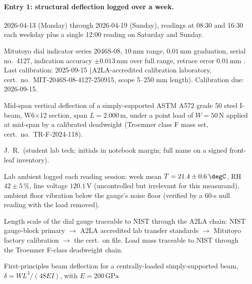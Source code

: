 \paragraph{Entry 1: structural deflection logged over a week.}

\begin{description}[leftmargin=2em, itemsep=2pt]
  \item[Date / time.] 2026-04-13 (Monday) through 2026-04-19
    (Sunday), readings at 08{:}30 and 16{:}30 each weekday plus a
    single 12{:}00 reading on Saturday and Sunday.
  \item[Instrument.] Mitutoyo dial indicator series 2046S-08,
    $10 \,\si{\milli\meter}$ range, $0.01 \,\si{\milli\meter}$
    graduation, serial no.\ 4127, indication accuracy
    $\pm 0.013 \,\si{\milli\meter}$ over full range, retrace error
    $0.01 \,\si{\milli\meter}$ \cite{web:ch01t3-mitutoyo-2046S}. Last
    calibration: 2025-09-15 (A2LA-accredited calibration laboratory,
    cert.\ no.\ MIT-2046S-08-4127-250915, scope 5--250
    \si{\milli\meter} length). Calibration due: 2026-09-15.
  \item[Measurand and setup.] Mid-span vertical deflection of a
    simply-supported ASTM A572 grade 50 steel I-beam, W6$\times$12
    section, span $L = 2.000 \,\si{\meter}$, under a point load of
    $W = 50 \,\si{\newton}$ applied at mid-span by a calibrated
    deadweight (Troemner class F mass set, cert.\ no.\
    TR-F-2024-118).
  \item[Operator.] J.~R.~(student lab tech; initials in notebook
    margin; full name on a signed front-leaf inventory).
  \item[Conditions.] Lab ambient logged each reading session:
    week mean $T = 21.4 \pm 0.6 \,\degC$, RH
    $42 \pm 5 \,\si{\percent}$, line voltage $120.1 \,\si{\volt}$
    (uncontrolled but irrelevant for this measurand), ambient floor
    vibration below the gauge's noise floor (verified by a 60-s
    null reading with the load removed).
  \item[Provenance of reference.] Length scale of the dial gauge
    traceable to NIST through the A2LA chain: NIST gauge-block
    primary $\to$ A2LA accredited lab transfer standards $\to$
    Mitutoyo factory calibration $\to$ the cert.\ on file. Load mass
    traceable to NIST through the Troemner F-class deadweight chain.
  \item[Estimate before reading.] First-principles beam deflection
    for a centrally-loaded simply-supported beam,
    $\delta = W L^3 / (48 E I)$, with $E = 200 \,\si{\giga\pascal}$

\end{description}

